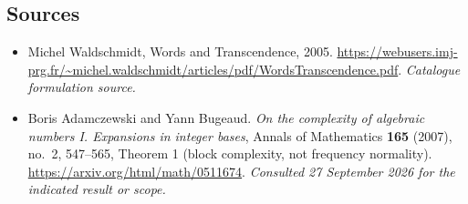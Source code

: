 \documentclass[11pt,a4paper]{article}
\numberwithin{equation}{section}
\begin{document}
\subsection{Sources}
\begin{itemize}\raggedright
\item[\textnormal{[S1]}]\hypertarget{source:1259:1}{} Michel Waldschmidt, Words and Transcendence, 2005.
\url{https://webusers.imj-prg.fr/~michel.waldschmidt/articles/pdf/WordsTranscendence.pdf}.
{\small\textit{Catalogue formulation source.}}
\item[\textnormal{[E1]}]\hypertarget{extra:1259:1}{} Boris Adamczewski and Yann Bugeaud.
\emph{On the complexity of algebraic numbers I. Expansions in integer bases}, Annals of Mathematics \textbf{165} (2007), no.~2, 547--565, Theorem 1 (block complexity, not frequency normality).
\url{https://arxiv.org/html/math/0511674}.
{\small\textit{Consulted 27 September 2026 for the indicated result or scope.}}
\end{itemize}
\end{document}

